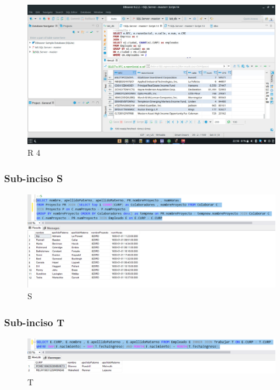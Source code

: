 \documentclass[a4paper, 12pt]{report}
\begin{document}
    \begin{figure}
        \includegraphics[width=\textwidth]
            {img/r4.jpeg}\hfill
    \caption{R 4}
    \end{figure}

\subsubsection*{Sub-inciso S}
    \begin{figure}
        \includegraphics[width=\textwidth]
            {img/S.png}\hfill
    \caption{S}
    \end{figure}

\subsubsection*{Sub-inciso T}
    \begin{figure}
        \includegraphics[width=\textwidth]
            {img/T.png}\hfill
    \caption{T}
    \end{figure}
\end{document}
